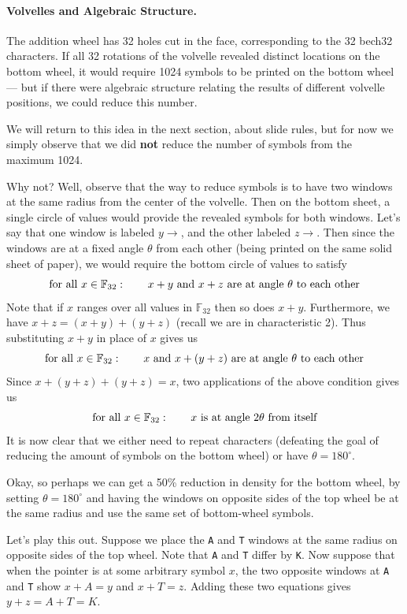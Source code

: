 \documentclass[letterpaper]{article}
\newcommand{\fttwo}{\mathbb{F}_{32}}
\newcommand{\vc}[1]{\texttt{#1}} %
\begin{document}
\paragraph{Volvelles and Algebraic Structure.} The addition wheel has 32 holes cut
in the face, corresponding to the 32 bech32 characters. If all 32 rotations
of the volvelle revealed distinct locations on the bottom wheel, it would
require 1024 symbols to be printed on the bottom wheel --- but if there
were algebraic structure relating the results of different volvelle positions,
we could reduce this number.

We will return to this idea in the next section, about slide rules, but for now
we simply observe that we did \textbf{not} reduce the number of symbols from
the maximum 1024.

Why not? Well, observe that the way to reduce symbols is to have two windows at
the same radius from the center of the volvelle. Then on the bottom sheet, a
single circle of values would provide the revealed symbols for both windows.
Let's say that one window is labeled $y\to$, and the other labeled $z\to$. Then
since the windows are at a fixed angle $\theta$ from each other (being printed
on the same solid sheet of paper), we would require the bottom circle of values
to satisfy
\[ \textnormal{for all } x\in\fttwo:\qquad x + y \textnormal{ and } x + z \textnormal{ are at angle $\theta$ to each other} \]
Note that if $x$ ranges over all values in $\fttwo$ then so does $x + y$. Furthermore,
we have $x + z = (x + y) + (y + z)$ (recall we are in characteristic 2).
Thus substituting $x + y$ in place of $x$ gives us
\[ \textnormal{for all } x\in\fttwo:\qquad x \textnormal{ and } x + (y + z) \textnormal{ are at angle $\theta$ to each other} \]
Since $x + (y + z) + (y + z) = x$, two applications of the above condition gives us
\[ \textnormal{for all } x\in\fttwo:\qquad x \textnormal{ is at angle $2\theta$ from itself} \]
It is now clear that we either need to repeat characters (defeating the goal
of reducing the amount of symbols on the bottom wheel) or have $\theta=180^\circ$.

Okay, so perhaps we can get a 50\% reduction in density for the bottom wheel, by
setting $\theta=180^\circ$ and having the windows on opposite sides of the top
wheel be at the same radius and use the same set of bottom-wheel symbols.

Let's play this out. Suppose we place the \vc{A} and \vc{T} windows at the
same radius on opposite sides of the top wheel. Note that \vc{A} and \vc{T}
differ by \vc{K}. Now suppose that when the pointer is at some arbitrary symbol $x$,
the two opposite windows at \vc{A} and \vc{T} show $x + A = y$ and $x + T = z$.
Adding these two equations gives $y + z = A + T = K$.
\end{document}
